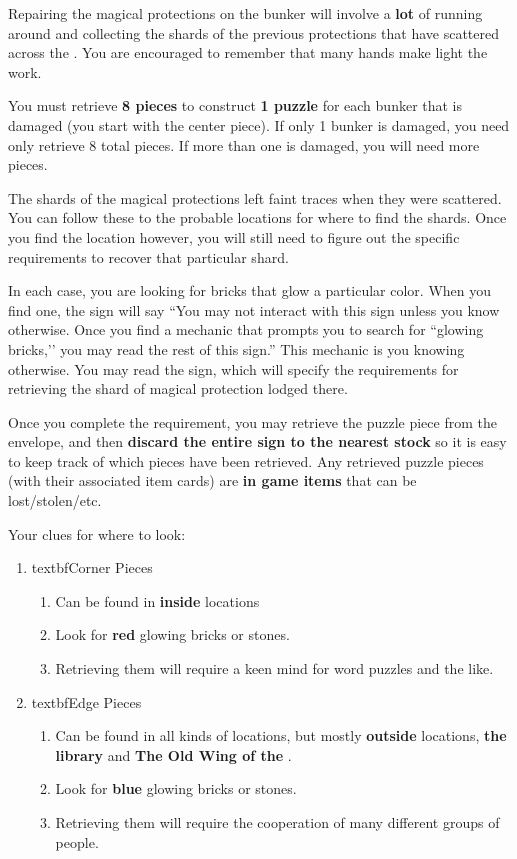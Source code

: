 \documentclass[green]{GL2020}
\begin{document}
\name{\gMagicalLayer{}}

Repairing the magical protections on the bunker will involve a \textbf{lot} of running around and collecting the shards of the previous protections that have scattered across the \pSc{}. You are encouraged to remember that many hands make light the work.

You must retrieve \textbf{8 pieces} to construct \textbf{1 puzzle} for each bunker that is damaged (you start with the center piece). If only 1 bunker is damaged, you need only retrieve 8 total pieces. If more than one is damaged, you will need more pieces.

The shards of the magical protections left faint traces when they were scattered. You can follow these to the probable locations for where to find the shards. Once you find the location however, you will still need to figure out the specific requirements to recover that particular shard.

In each case, you are looking for bricks that glow a particular color. When you find one, the sign will say “You may not interact with this sign unless you know otherwise. Once you find a mechanic that prompts you to search for ``glowing bricks,’’ you may read the rest of this sign.” This mechanic is you knowing otherwise. You may read the sign, which will specify the requirements for retrieving the shard of magical protection lodged there.

Once you complete the requirement, you may retrieve the puzzle piece from the envelope, and then \textbf{discard the entire sign to the nearest stock} so it is easy to keep track of which pieces have been retrieved. Any retrieved puzzle pieces (with their associated item cards) are \textbf{in game items} that can be lost/stolen/etc.

Your clues for where to look:
\begin{enumerate}
  \item textbf{Corner Pieces}
  \begin{enumerate}
    \item Can be found in \textbf{inside} locations
    \item Look for \textbf{red} glowing bricks or stones.
    \item Retrieving them will require a keen mind for word puzzles and the like.
  \end{enumerate}  
  \item textbf{Edge Pieces}
  \begin{enumerate}
    \item Can be found in all kinds of locations, but mostly \textbf{outside} locations, \textbf{the library} and \textbf{The Old Wing of the \pSc{}}.
    \item Look for \textbf{blue} glowing bricks or stones.
    \item Retrieving them will require the cooperation of many different groups of people.
  \end{enumerate}  
\end{enumerate}
\end{document}
